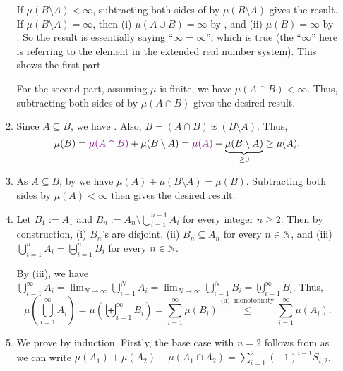 \begin{enumerate}
\begin{pf}
\begin{enumerate}
If \(\mu(B\setminus A)<\infty\), subtracting both sides of
 by \(\mu(B\setminus A)\) gives the result. If
\(\mu(B\setminus A)=\infty\), then (i) \(\mu(A\cup B)=\infty\) by
, and (ii) \(\mu(B)=\infty\) by . So the result
is essentially saying ``\(\infty=\infty\)'', which is true (the ``\(\infty\)''
here is referring to the element in the extended real number system). This
shows the first part.

For the second part, assuming \(\mu\) is finite, we have \(\mu(A\cap B)<\infty\).
Thus, subtracting both sides of   by \(\mu(A\cap B)\)
gives the desired result.
\item Since \(A\subseteq B\), we have . Also, \(B=(A\cap
B)\uplus (B\setminus A)\). Thus,
\[
\mu(B)={\color{violet}\mu(A\cap B)}+\mu(B\setminus A)
={\color{violet}\mu(A)}+\underbrace{\mu(B\setminus A)}_{\ge 0}
\ge \mu(A).
\]
\item As \(A\subseteq B\), by  we have \(\mu(A)+\mu(B\setminus
A)=\mu(B)\). Subtracting both sides by \(\mu(A)<\infty\) then gives the desired
result.
\item Let \(B_1:=A_1\) and \(B_n:=A_n\setminus \bigcup_{i=1}^{n-1}A_i\) for
every integer \(n\ge 2\).  Then by construction, (i) \(B_n\)'s are disjoint,
(ii) \(B_n\subseteq A_n\) for every \(n\in\mathbb{N}\), and (iii)
\(\bigcup_{i=1}^{n}A_i=\biguplus_{i=1}^{n}B_i\) for every \(n\in\mathbb{N}\). 

By (iii), we have \(\bigcup_{i=1}^{\infty}A_i
=\lim_{N\to\infty}\bigcup_{i=1}^{N}A_i =\lim_{N\to\infty}\biguplus_{i=1}^{N}B_i
=\biguplus_{i=1}^{\infty}B_i \). Thus,
\[
\mu\left(\bigcup_{i=1}^{\infty}A_i\right)
=\mu\left(\biguplus_{i=1}^{\infty}B_i\right)
=\sum_{i=1}^{\infty}\mu(B_i)
\overset{\text{(ii), monotonicity}}{\le}\sum_{i=1}^{\infty}\mu(A_i).
\]
\item We prove by induction. Firstly, the base case with \(n=2\) follows from
 as we can write
\(\mu(A_1)+\mu(A_2)-\mu(A_1\cap A_2)=\sum_{i=1}^{2}(-1)^{i-1}S_{i,2}\).


\end{enumerate}
\end{pf}
\end{enumerate}
